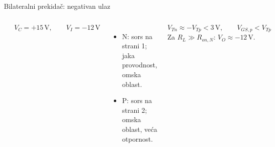 \begin{frame}[label=09_3-s061]{Bilateralni prekidač: negativan ulaz}
\begin{columns}[c,onlytextwidth]
\begin{center}

\end{center}
\[V_C=+15\,\mathrm V,\qquad V_I=-12\,\mathrm V\]
\begin{itemize}
\item N: sors na strani 1; jaka provodnost, omska oblast.
\item P: sors na strani 2; omska oblast, veća otpornost.
\end{itemize}
\[V_{Tn}\approx -V_{Tp}<3\,\mathrm V,\qquad V_{GS,p}<V_{Tp}\]
Za $R_L\gg R_{on,N}$: $V_O\approx-12\,\mathrm V$.
\end{columns}
\end{frame}

